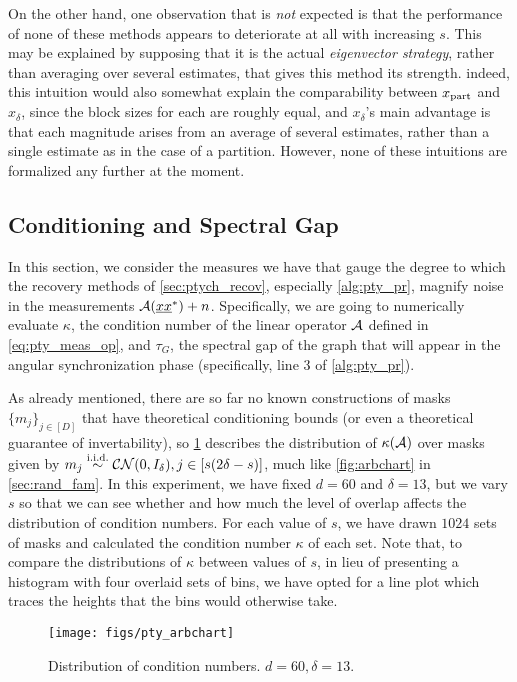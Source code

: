 On the other hand, one observation that is \emph{not} expected is that the performance of none of these methods appears to deteriorate at all with increasing $s$.  This may be explained by supposing that it is the actual \emph{eigenvector strategy}, rather than averaging over several estimates, that gives this method its strength.  indeed, this intuition would also somewhat explain the comparability between $x_{\rm part}$ and $x_\delta$, since the block sizes for each are roughly equal, and $x_\delta$'s main advantage is that each magnitude arises from an average of several estimates, rather than a single estimate as in the case of a partition.  However, none of these intuitions are formalized any further at the moment.

\subsection{Conditioning and Spectral Gap}
\label{sec:pty_cond}

In this section, we consider the measures we have that gauge the degree to which the recovery methods of \cref{sec:ptych_recov}, especially \cref{alg:pty_pr}, magnify noise in the measurements $\mathcal{A}(\underline{x} \underline{x}^*) + n$.  Specifically, we are going to numerically evaluate $\kappa$, the condition number of the linear operator $\mathcal{A}$ defined in \eqref{eq:pty_meas_op}, and $\tau_G$, the spectral gap of the graph that will appear in the angular synchronization phase (specifically, line 3 of \cref{alg:pty_pr}).

As already mentioned, there are so far no known constructions of masks $\{m_j\}_{j \in [D]}$ that have theoretical conditioning bounds (or even a theoretical guarantee of invertability), so \cref{fig:pty_cond} describes the distribution of $\kappa(\mathcal{A})$ over masks given by $m_j \overset{\text{i.i.d.}}{\sim} \mathcal{C N}(0, I_\delta), j \in [s(2 \delta - s)]$, much like \cref{fig:arbchart} in \cref{sec:rand_fam}.  In this experiment, we have fixed $d = 60$ and $\delta = 13$, but we vary $s$ so that we can see whether and how much the level of overlap affects the distribution of condition numbers.  For each value of $s$, we have drawn $1024$ sets of masks and calculated the condition number $\kappa$ of each set.  Note that, to compare the distributions of $\kappa$ between values of $s$, in lieu of presenting a histogram with four overlaid sets of bins, we have opted for a line plot which traces the heights that the bins would otherwise take.

\begin{figure}[htb]
  \centering
  \texttt{[image: figs/pty\_arbchart]}
  \caption{Distribution of condition numbers.  $d = 60, \delta = 13$.}
  \label{fig:pty_cond}
\end{figure}

